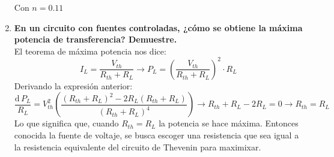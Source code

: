\documentclass[a4paper,11pt]{report}
\begin{document}
\begin{enumerate}[label=\arabic*),font=\bfseries, style=nextline]
\begin{figure}[H]
\end{figure}
Con $n = 0.11$
\item \textbf{En un circuito con fuentes controladas, ¿cómo se obtiene la máxima potencia de transferencia? Demuestre.}\\
El teorema de máxima potencia nos dice:
$$
I_{L} = \frac{V_{th}}{R_{th} + R_{L}} \longrightarrow P_{L} = \left(\frac{V_{th}}{R_{th}+R_{L}}\right)^{2} \cdot R_{L}
$$
Derivando la expresión anterior:
$$
\frac{\mathrm{d}\, P_{L}}{R_{L}} = V_{th}^{2}\left( \frac{(R_{th}+R_{L})^{2}-2R_{L}(R_{th}+R_{L})}{(R_{th}+R_{L})^{4}} \right) \rightarrow R_{th}+R_{L} - 2R_{L} = 0 \longrightarrow R_{th} = R_{L}
$$
Lo que significa que, cuando $R_{th}=R_{L}$ la potencia se hace máxima. Entonces conocida la fuente de voltaje, se busca escoger una resistencia que sea igual a la resistencia equivalente del circuito de Thevenin para maximixar.
\end{enumerate}
\end{document}
